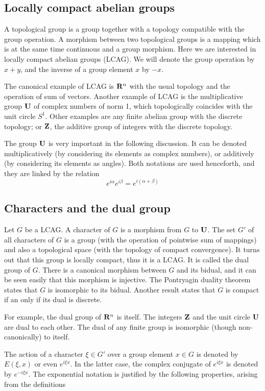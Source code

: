 \subsection{Locally compact abelian groups}

A topological group is a group together with a topology compatible with the
group operation.  A morphism between two topological groups is a mapping
which is at the same time continuous and a group morphism.
Here we are interested in locally compact abelian groups (LCAG).  We
will denote the group operation by $x+y$, and the inverse of a group element
$x$ by $-x$.

The canonical example of LCAG is $\mathbf{R}^n$ with the usual topology and
the operation of sum of vectors.  Another example of LCAG is the
multiplicative group $\mathbf{U}$ of complex numbers of norm 1, which
topologically coincides with the unit circle $S^1$.  Other examples are any
finite abelian group with the discrete topology; or $\mathbf{Z}$, the
additive group of integers with the discrete topology.

The group $\mathbf{U}$ is very important in the following discussion.  It can
be denoted multiplicatively (by considering its elements as complex numbers),
or additively (by considering its elements as angles).  Both notations are
used henceforth, and they are linked by the relation
\[
e^{i\alpha}e^{i\beta}
=
e^{i(\alpha+\beta)}
\]


\subsection{Characters and the dual group}

Let $G$ be a LCAG.  A character of $G$ is a morphism from $G$ to
$\mathbf{U}$.  The set $G'$ of all characters of $G$ is a group (with the
operation of pointwise sum of mappings) and also a topological space (with the topology
of compact convergence).  It turns out that this group is locally compact,
thus it is a LCAG.  It is called the dual group of $G$.  There is a canonical
morphism between $G$ and its bidual, and it can be seen easily that this
morphism is injective.  The Pontryagin duality theorem states that $G$ is
isomorphic to its bidual.  Another result states that $G$ is compact if an
only if its dual is discrete.

For example, the dual group of $\mathbf{R}^n$ is itself.  The integers
$\mathbf{Z}$ and the unit circle $\mathbf{U}$ are dual to each other.
The dual of any finite group is isomorphic (though non-canonically) to
itself.

The action of a character $\xi\in G'$ over a group element $x\in G$ is
denoted by $E(\xi,x)$ or even $e^{i\xi x}$.  In the latter case, the complex
conjugate of $e^{i\xi x}$ is denoted by $e^{-i\xi x}$.  The exponential
notation is justified by the following properties, arising from the
definitions

